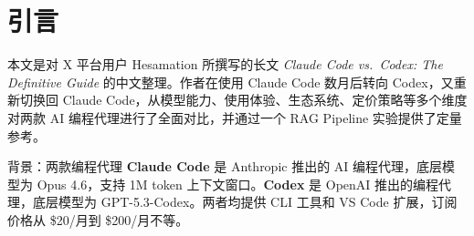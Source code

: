 \section{引言}

本文是对 X 平台用户 Hesamation 所撰写的长文 \textit{Claude Code vs.\ Codex: The Definitive Guide} 的中文整理。作者在使用 Claude Code 数月后转向 Codex，又重新切换回 Claude Code，从模型能力、使用体验、生态系统、定价策略等多个维度对两款 AI 编程代理进行了全面对比，并通过一个 RAG Pipeline 实验提供了定量参考。

\begin{knowledgebox}{背景：两款编程代理}
\textbf{Claude Code} 是 Anthropic 推出的 AI 编程代理，底层模型为 Opus 4.6，支持 1M token 上下文窗口。\textbf{Codex} 是 OpenAI 推出的编程代理，底层模型为 GPT-5.3-Codex。两者均提供 CLI 工具和 VS Code 扩展，订阅价格从 \$20/月到 \$200/月不等。
\end{knowledgebox}

